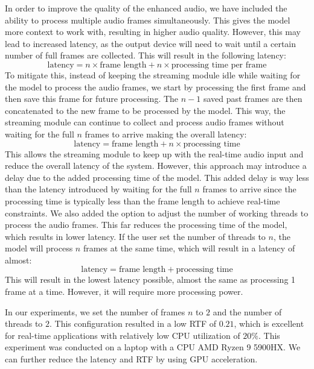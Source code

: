 In order to improve the quality of the enhanced audio, we have included the ability to process multiple audio frames simultaneously. This gives the model more context to work with, resulting in higher audio quality. However, this may lead to increased latency, as the output device will need to wait until a certain number of full frames are collected. This will result in the following latency:
$$ \text{latency} = n \times \text{frame length} + n \times \text{processing time per frame} $$
To mitigate this, instead of keeping the streaming module idle while waiting for the model to process the audio frames, we start by processing the first frame and then save this frame for future processing. The $n-1$ saved past frames are then concatenated to the new frame to be processed by the model. This way, the streaming module can continue to collect and process audio frames without waiting for the full $n$ frames to arrive making the overall latency:
$$ \text{latency} = \text{frame length} + n \times \text{processing time} $$
This allows the streaming module to keep up with the real-time audio input and reduce the overall latency of the system. However, this approach may introduce a delay due to the added processing time of the model. This added delay is way less than the latency introduced by waiting for the full $n$ frames to arrive since the processing time is typically less than the frame length to achieve real-time constraints. We also added the option to adjust the number of working threads to process the audio frames. This far reduces the processing time of the model, which results in lower latency. If the user set the number of threads to $n$, the model will process $n$ frames at the same time, which will result in a latency of almost:
$$ \text{latency} = \text{frame length} + \text{processing time} $$
This will result in the lowest latency possible, almost the same as processing 1 frame at a time. However, it will require more processing power.

In our experiments, we set the number of frames $n$ to $2$ and the number of threads to $2$. This configuration resulted in a low RTF of $0.21$, which is excellent for real-time applications with relatively low CPU utilization of $20\%$. This experiment was conducted on a laptop with a CPU AMD Ryzen 9 5900HX. We can further reduce the latency and RTF by using GPU acceleration.
